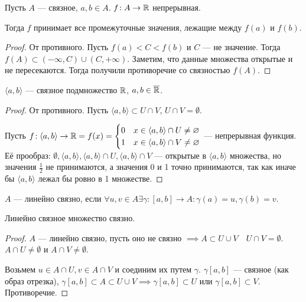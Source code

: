 \begin{consequence}
    Пусть $A$ --- связное, $a, b \in A$. $f\!: A \to \mathbb{R}$ непрерывная. 

    Тогда  $f$ принимает все промежуточные значения, лежащие между  $f(a)$ и  $f(b)$.
\end{consequence}
\begin{proof}
    От противного. Пусть $f(a) < C < f(b)$ и $C$ --- не значение. Тогда  $f(A) \subset (-\infty, C) \cup (C, +\infty)$. Заметим, что данные множества открытые и не пересекаются. Тогда получили противоречие со связностью  $f(A)$.
\end{proof}
\begin{theorem}
    $\langle a, b \rangle$ --- связное подмножество  $\mathbb{R}$,  $a, b \in \overline{\mathbb{R}}$.
\end{theorem}
\begin{proof}
    От противного. Пусть $\langle a, b \rangle \subset U \cap V$,  $U \cap V = \emptyset$. 

    Пусть  $f\!: \langle a, b \rangle \to \mathbb{R} = f(x) = \begin{cases} 0 & x \in \langle a, b \rangle \cap U \neq \varnothing \\ 1 & x \in \langle a, b \rangle \cap V \neq \varnothing \end{cases}$ --- непрерывная функция. Её прообраз:  $\emptyset, \langle a, b \rangle, \langle a, b \rangle \cap U, \langle a, b \rangle \cap V$ --- открытые в  $\langle a, b \rangle$ множества, но значения  $\frac{1}{2}$ не принимаются, а значения 0 и 1 точно принимаются, так как иначе бы $\langle a, b \rangle$ лежал бы ровно в 1 множестве. 
\end{proof}
\begin{definition}
    $A$ --- линейно связно, если  $\forall u, v \in A \exists \gamma\!: [a, b] \to A\!: \gamma(a) = u, \gamma(b) = v$.
\end{definition}
\begin{theorem}
    Линейно связное множество связно.
\end{theorem}
\begin{proof}
    $A$ --- линейно связно, пусть оно не связно $\implies A \subset U \cup V\quad U \cap V = \emptyset$.  $A \cap U \neq \emptyset$ и  $A \cap V \neq \emptyset$. 

    Возьмем  $u \in A \cap U, v \in A \cap V$ и соединим их путем  $\gamma$.  $\gamma[a,b]$ --- связное (как образ отрезка),  $\gamma[a, b] \subset A \subset U \cup V \implies \gamma[a, b] \subset U$ или $\gamma[a, b] \subset V$. Противоречие. 
\end{proof}
